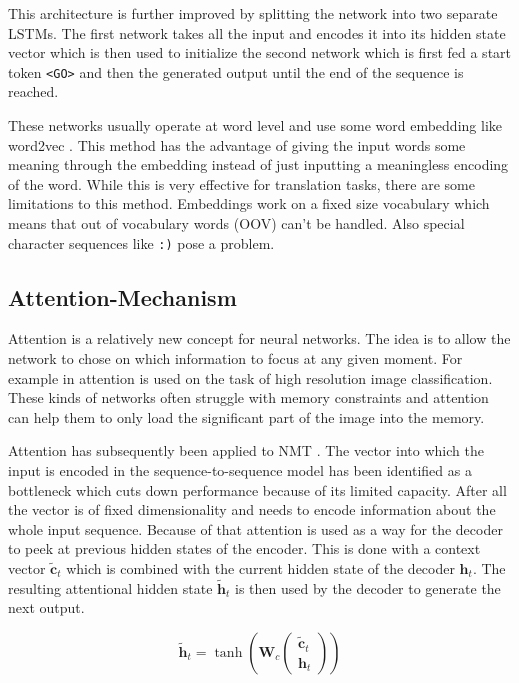 This architecture is further improved by splitting the network into two separate LSTMs. The first network takes all the input and encodes it into its hidden state vector which is then used to initialize the second network which is first fed a start token \texttt{<GO>} and then the generated output until the end of the sequence is reached.

These networks usually operate at word level and use some word embedding like word2vec \cite{word2vec}. This method has the advantage of giving the input words some meaning through the embedding instead of just inputting a meaningless encoding of the word. While this is very effective for translation tasks, there are some limitations to this method. Embeddings work on a fixed size vocabulary which means that out of vocabulary words (OOV) can't be handled. Also special character sequences like \texttt{:)} pose a problem.

\subsection{Attention-Mechanism}

Attention is a relatively new concept for neural networks. The idea is to allow the network to chose on which information to focus at any given moment. For example in \cite{visual_attention} attention is used on the task of high resolution image classification. These kinds of networks often struggle with memory constraints and attention can help them to only load the significant part of the image into the memory.

Attention has subsequently been applied to NMT \cite{attention_bahdanau,attention_luong}. The vector into which the input is encoded in the sequence-to-sequence model has been identified as a bottleneck which cuts down performance because of its limited capacity. After all the vector is of fixed dimensionality and needs to encode information about the whole input sequence. Because of that attention is used as a way for the decoder to peek at previous hidden states of the encoder. This is done with a context vector \(\tilde{\mathbf{c}}_t\) which is combined with the current hidden state of the decoder \(\mathbf{h}_t\). The resulting attentional hidden state \(\tilde{\mathbf{h}}_t\) is then used by the decoder to generate the next output.

\begin{equation*}
  \tilde{\mathbf{h}}_t = \tanh \left(\mathbf{W}_c \begin{pmatrix} \tilde{\mathbf{c}}_t \\ \mathbf{h}_{t} \end{pmatrix} \right)
\end{equation*}


